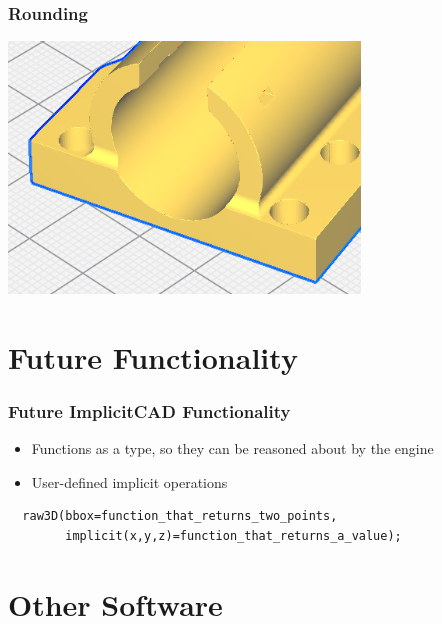 \documentclass{beamer}
\begin{document}
\begin{frame}
\frametitle{Rounding}
\includegraphics[width=0.7\textwidth, center]{cura-bearing_holder.png}
\end{frame}

\section{Future Functionality}
\begin{frame}[fragile]
\frametitle{Future ImplicitCAD Functionality}
\begin{itemize}
\item Functions as a type, so they can be reasoned about by the engine
\item User-defined implicit operations
\end{itemize}
\lstset{basicstyle=\ttfamily\scriptsize}
\begin{lstlisting}
  raw3D(bbox=function_that_returns_two_points,
        implicit(x,y,z)=function_that_returns_a_value);
\end{lstlisting}
\end{frame}

\section{Other Software}
\end{document}
